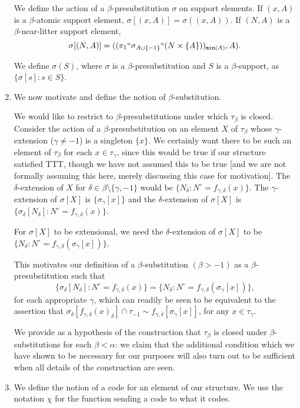 \documentclass[12pt]{article}
\begin{document}
\begin{enumerate}
We define the action of a $\beta$-presubstitution $\sigma$ on support elements.  If $(x,A)$ is a $\beta$-atomic support element, $\sigma[(x,A)] = \sigma((x,A))$.  If $(N,A)$ is a $\beta$-near-litter support element, $$\sigma[(N,A)] = ((\pi_1``\sigma_{A \cup \{-1\}}``(N\times \{A\}))_{{\tt min}(A)},A).$$

We define $\sigma(S)$, where $\sigma$ is a $\beta$-presubstitution and $S$ is a $\beta$-support, as $\{\sigma[s]:s \in S\}$.

\item  We now motivate and define the notion of $\beta$-substitution.

We would like to restrict to $\beta$-presubstitutions under which $\tau_\beta$ is closed.  Consider the action of a $\beta$-presubstitution on an element $X$ of $\tau_\beta$ whose $\gamma$-extension ($\gamma \neq -1$) is a singleton $\{x\}$.  We certainly want there to be such an element of $\tau_\beta$
for each $x \in \tau_\gamma$, since this would be true if our structure satisfied TTT, though we have not assumed this to be true [and we are not formally assuming this here, merely discussing this case for motivation].  The $\delta$-extension of $X$ for $\delta \in \beta \setminus \{\gamma,-1\}$ would be $\{N_\delta:N^\circ = f_{\gamma,\delta}(x)\}$.
The $\gamma$-extension of $\sigma[X]$ is $\{\sigma_\gamma[x]\}$ and the $\delta$-extension of $\sigma[X]$ is $\{\sigma_\delta[N_\delta]:N^\circ = f_{\gamma,\delta}(x)\}$.  

For $\sigma[X]$ to be extensional, we need the $\delta$-extension of $\sigma[X]$ to be $\{N_\delta:N^\circ = f_{\gamma,\delta}(\sigma_\gamma[x])\}$.

This motivates our definition of a $\beta$-substitution $(\beta>-1)$ as a $\beta$-presubstitution such that $$\{\sigma_\delta[N_\delta]:N^\circ = f_{\gamma,\delta}(x)\} = \{N_\delta:N^\circ = f_{\gamma,\delta}(\sigma_\gamma[x])\},$$ for each appropriate $\gamma$, which can readily be seen to be equivalent to the assertion that
$\sigma_\delta[f_{\gamma,\delta}(x)_\delta] \cap \tau_{-1} \sim  f_{\gamma,\delta}[\sigma_\gamma[x]]$, for any $x \in \tau_\gamma$.

We provide as a hypothesis of the construction that $\tau_\beta$ is closed under $\beta$-substitutions for each $\beta<\alpha$:  we claim that the additional condition which we have shown to be necessary for our purposes will also turn out to be sufficient when all details of the construction are seen.

\item We define the notion of a code for an element of our structure.  We use the notation $\chi$ for the function sending a code to what it codes.


\end{enumerate}
\end{document}
